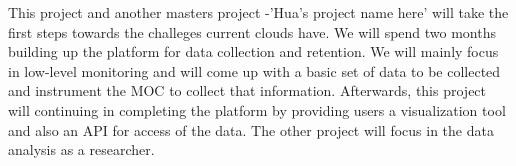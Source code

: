   This project and another masters project -'Hua's project name here' will take the first steps towards the challeges current clouds have. We will spend two months building up the platform for data collection and retention. We will mainly focus in low-level monitoring and will come up with a basic set of data to be collected and instrument the MOC to collect that information. Afterwards, this project will continuing in completing the platform by providing users a visualization tool and also an API for access of the data. The other project will focus in the data analysis as a researcher.